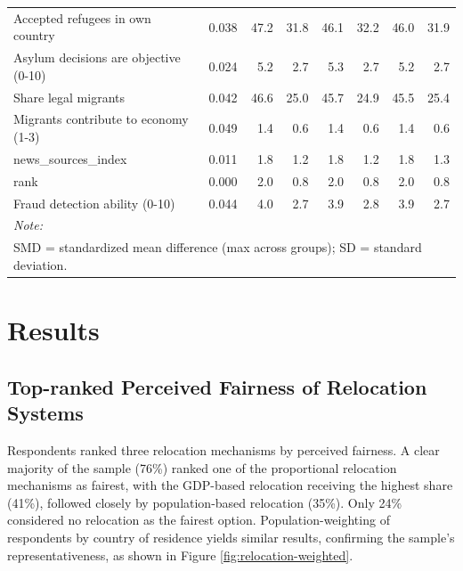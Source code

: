 \documentclass[
  12pt,
  a4paper,
]{article}
\begin{document}
\begin{table}
\begin{tabular}[t]{llrrrrrr}
Accepted refugees in own country & 0.038 & 47.2 & 31.8 & 46.1 & 32.2 & 46.0 & 31.9\\
Asylum decisions are objective (0-10) & 0.024 & 5.2 & 2.7 & 5.3 & 2.7 & 5.2 & 2.7\\
Share legal migrants & 0.042 & 46.6 & 25.0 & 45.7 & 24.9 & 45.5 & 25.4\\
\addlinespace
Migrants contribute to economy (1-3) & 0.049 & 1.4 & 0.6 & 1.4 & 0.6 & 1.4 & 0.6\\
news\_sources\_index & 0.011 & 1.8 & 1.2 & 1.8 & 1.2 & 1.8 & 1.3\\
rank & 0.000 & 2.0 & 0.8 & 2.0 & 0.8 & 2.0 & 0.8\\
Fraud detection ability (0-10) & 0.044 & 4.0 & 2.7 & 3.9 & 2.8 & 3.9 & 2.7\\
\bottomrule
\multicolumn{8}{l}{\rule{0pt}{1em}\textit{Note: }}\\
\multicolumn{8}{l}{\rule{0pt}{1em}SMD = standardized mean difference (max across groups); SD = standard deviation.}\\
\end{tabular}
\end{table}

\section{Results}\label{results}

\subsection{Top-ranked Perceived Fairness of Relocation Systems}\label{top-ranked-perceived-fairness-of-relocation-systems}

Respondents ranked three relocation mechanisms by perceived fairness. A clear majority of the sample (76\%) ranked one of the proportional relocation mechanisms as fairest, with the GDP-based relocation receiving the highest share (41\%), followed closely by population-based relocation (35\%). Only 24\% considered no relocation as the fairest option. Population-weighting of respondents by country of residence yields similar results, confirming the sample's representativeness, as shown in Figure \ref{fig:relocation-weighted}.
\end{document}
